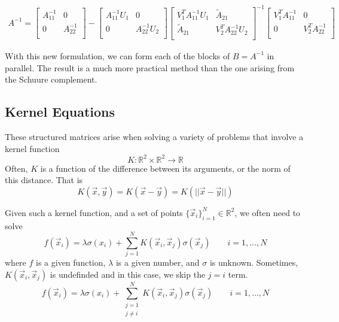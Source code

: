 \begin{align*}
    A^{-1} =
    \begin{bmatrix}
       A_{11}^{-1} & 0 \\
       0 & A_{22}^{-1} \\
    \end{bmatrix}
    -
    \begin{bmatrix}
       A_{11}^{-1}U_1 & 0 \\
       0 & A_{22}^{-1}U_2 \\
    \end{bmatrix}
    \begin{bmatrix}
       V_1^TA_{11}^{-1}U_1 & \widetilde{A}_{21} \\
       \widetilde{A}_{21} & V_2^TA_{22}^{-1}U_2 \\
   \end{bmatrix}^{-1}
    \begin{bmatrix}
       V_1^TA_{11}^{-1} & 0 \\
       0 & V_2^TA_{22}^{-1} \\
    \end{bmatrix}
\end{align*}

With this new formulation, we can form each of the blocks of $B=A^{-1}$ in parallel. The result is a much more practical method than the one arising from the Schuure complement.

\subsection{Kernel Equations}
These structured matrices arise when solving a variety of problems that involve a kernel function
\begin{equation*}
    K:\mathbb{R}^2\times\mathbb{R}^2\rightarrow\mathbb{R}
\end{equation*}
Often, $K$ is a function of the difference between its arguments, or the norm of this distance. That is
\begin{equation*}
    K(\vec{x}, \vec{y}) = K(\vec{x}-\vec{y}) = K(||\vec{x}-\vec{y}||)
\end{equation*}

Given such a kernel function, and a set of points $\{\vec{x}_i\}_{i=1}^N\in\mathbb{R}^2$, we often need to solve
\begin{equation*}
    f(\vec{x}_i) = \lambda \sigma(x_i) +
    \sum_{j=1}^N K(\vec{x}_i, \vec{x}_j) \sigma(\vec{x}_j)
    \qquad i=1, \ldots, N
\end{equation*}
where $f$ is a given function, $\lambda$ is a given number, and $\sigma$ is unknown. Sometimes, $K(\vec{x}_i, \vec{x}_j)$ is undefinded and in this case, we skip the $j=i$ term.
\begin{equation*}
    f(\vec{x}_i) = \lambda \sigma(x_i) +
    \sum_{\substack{j=1 \\ j\neq i}}^N K(\vec{x}_i, \vec{x}_j) \sigma(\vec{x}_j)
    \qquad i=1, \ldots, N
\end{equation*}

